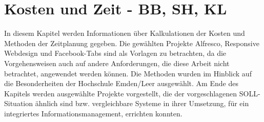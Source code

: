 
\chapter{Kosten und Zeit - BB, SH, KL}

In diesem Kapitel werden Informationen \"uber Kalkulationen der Kosten und Methoden der Zeitplanung gegeben. Die gew\"ahlten Projekte Alfresco, Responsive Webdesign und Facebook-Tabs sind als Vorlagen zu betrachten, da die Vorgehensweisen auch auf andere Anforderungen, die diese Arbeit nicht betrachtet, angewendet werden k\"onnen. Die Methoden wurden im Hinblick auf die Besonderheiten der Hochschule Emden/Leer ausgew\"ahlt. Am Ende des Kapitels werden ausgew\"ahlte Projekte vorgestellt, die der vorgeschlagenen SOLL-Situation \"ahnlich sind bzw. vergleichbare Systeme in ihrer Umsetzung, f\"ur ein integriertes Informationsmanagement, errichten konnten.





